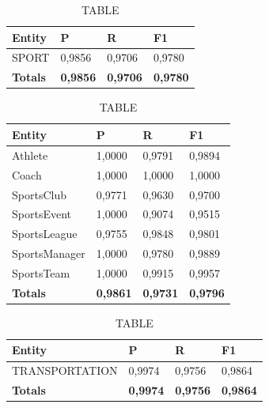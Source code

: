 \documentclass[thesis=M,english]{FITthesis}[2018/05/30]
\begin{document}

	\begin{table}[H]\centering
		\caption{TABLE}
		\label{}
		\begin{tabular}{|l|l|l|l|}
			\hline {\textbf{Entity}} & {\textbf{P}} & {\textbf{R}} & {\textbf{F1}}\\\hline
				SPORT & 0,9856 & 0,9706 & 0,9780\\\hline
				\textbf{Totals} & \textbf{0,9856} & \textbf{0,9706} & \textbf{0,9780}\\\hline
		\end{tabular}
	\end{table}

	\begin{table}[H]\centering
		\caption{TABLE}
		\label{}
		\begin{tabular}{|l|l|l|l|}
			\hline {\textbf{Entity}} & {\textbf{P}} & {\textbf{R}} & {\textbf{F1}}\\\hline
				Athlete & 1,0000 & 0,9791 & 0,9894\\
				Coach & 1,0000 & 1,0000 & 1,0000\\
				SportsClub & 0,9771 & 0,9630 & 0,9700\\
				SportsEvent & 1,0000 & 0,9074 & 0,9515\\
				SportsLeague & 0,9755 & 0,9848 & 0,9801\\
				SportsManager & 1,0000 & 0,9780 & 0,9889\\				
				SportsTeam & 1,0000 & 0,9915 & 0,9957\\\hline
				\textbf{Totals} & \textbf{0,9861} & \textbf{0,9731} & \textbf{0,9796}\\\hline
		\end{tabular}
	\end{table}	

	\begin{table}[H]\centering
		\caption{TABLE}
		\label{}
		\begin{tabular}{|l|l|l|l|}
			\hline {\textbf{Entity}} & {\textbf{P}} & {\textbf{R}} & {\textbf{F1}}\\\hline
				TRANSPORTATION & 0,9974 & 0,9756 & 0,9864\\\hline
				\textbf{Totals} & \textbf{0,9974} & \textbf{0,9756} & \textbf{0,9864}\\\hline
		\end{tabular}
	\end{table}
	
\end{document}
